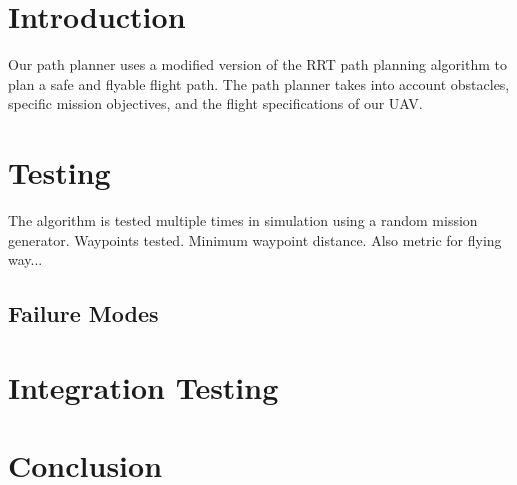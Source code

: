 \documentclass[]{auvsi_doc}
\begin{document}
\begin{AUVSITitlePage}
\begin{artifacttable}
\end{artifacttable}
\end{AUVSITitlePage}

\section{Introduction}
Our path planner uses a modified version of the RRT path planning algorithm to plan a safe and flyable flight path. The path planner takes into account obstacles, specific mission objectives, and the flight specifications of our UAV. 

\section{Testing}
The algorithm is tested multiple times in simulation using a random mission generator. Waypoints tested. Minimum waypoint distance. Also metric for flying way...

\subsection{Failure Modes}

\section{Integration Testing}


\section{Conclusion}
\end{document}
